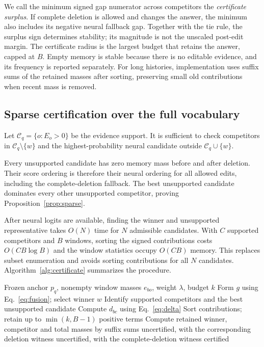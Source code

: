 We call the minimum signed gap numerator across competitors the \emph{certificate surplus}. If complete deletion is allowed and changes the answer, the minimum also includes its negative neural fallback gap. Together with the tie rule, the surplus sign determines stability; its magnitude is not the unscaled post-edit margin. The certificate radius is the largest budget that retains the answer, capped at $B$. Empty memory is stable because there is no editable evidence, and its frequency is reported separately. For long histories, implementation uses suffix sums of the retained masses after sorting, preserving small old contributions when recent mass is removed.

\subsection{Sparse certification over the full vocabulary}
\begin{proposition}
Let $\mathcal C_q=\{o:E_o>0\}$ be the evidence support. It is sufficient to check competitors in $\mathcal C_q\setminus\{w\}$ and the highest-probability neural candidate outside $\mathcal C_q\cup\{w\}$.
\label{prop:sparse}
\end{proposition}
Every unsupported candidate has zero memory mass before and after deletion. Their score ordering is therefore their neural ordering for all allowed edits, including the complete-deletion fallback. The best unsupported candidate dominates every other unsupported competitor, proving Proposition~\ref{prop:sparse}.

After neural logits are available, finding the winner and unsupported representative takes $O(N)$ time for $N$ admissible candidates. With $C$ supported competitors and $B$ windows, sorting the signed contributions costs $O(CB\log B)$ and the window statistics occupy $O(CB)$ memory. This replaces subset enumeration and avoids sorting contributions for all $N$ candidates. Algorithm~\ref{alg:certificate} summarizes the procedure.

\begin{algorithm}[t]
\caption{Exact certification of a neural--memory prediction}
\label{alg:certificate}
\begin{algorithmic}[1]
\Require Frozen anchor $p_q$, nonempty window masses $e_{bo}$, weight $\lambda$, budget $k$
\State Form $g$ using Eq.~\eqref{eq:fusion}; select winner $w$
\State Identify supported competitors and the best unsupported candidate
  \State Compute $d_{bc}$ using Eq.~\eqref{eq:delta}
  \State Sort contributions; retain up to $\min(k,B-1)$ positive terms
  \State Compute retained winner, competitor and total masses by suffix sums
    \State \Return uncertified, with the corresponding deletion witness
  \EndIf
\EndFor
{}
  \State \Return uncertified, with the complete-deletion witness
\EndIf
\State \Return certified
\end{algorithmic}
\end{algorithm}

